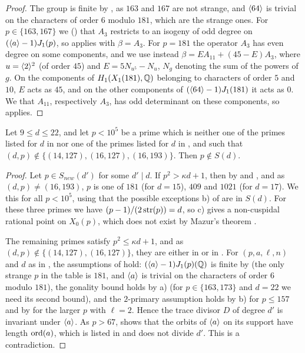 \begin{proof}
The group is finite by , as $163$ and $167$ are not strange, and $\langle 64\rangle$ is trivial on the characters of order $6$ modulo $181$, which are the strange ones. For $p\in\{163,167\}$ we  () that $A_3$ restricts to an isogeny of odd degree on $(\langle a\rangle-1)J_1(p)$, so  applies with $\beta=A_3$. For $p=181$ the operator $A_3$ has even degree on some components, and we use instead $\beta=EA_{11}+(45-E)A_3$, where $u=\langle 2\rangle^2$ (of order $45$) and $E=5N_{u^5}-N_u$, $N_g$ denoting the sum of the powers of $g$. On the components of $H_1(X_1(181),\mathbb{Q})$ belonging to characters of order $5$ and $10$, $E$ acts as $45$, and on the other components of $(\langle 64\rangle-1)J_1(181)$ it acts as $0$. We  that $A_{11}$, respectively $A_3$, has odd determinant on these components, so  applies.
\end{proof}

\begin{proposition}\label{prop:medium}
Let $9\leq d\leq 22$, and let $p<10^5$ be a prime which is neither one of the primes listed for $d$ in  nor one of the primes listed for $d$ in , and such that $(d,p)\notin\{(14,127),(16,127),(16,193)\}$. Then $p\notin S(d)$.
\end{proposition}

\begin{proof}
Let $p\in S_{new}(d')$ for some $d'\mid d$. If $p^2>\kappa d+1$, then by  and \cite[Table 2]{DSt}, and as $(d,p)\neq(16,193)$, $p$ is one of $181$ (for $d=15$), $409$ and $1021$ (for $d=17$). We  this for all $p<10^5$, using that the possible exceptions b) of  are in $S(d)$. For these three primes we have $(p-1)/(2\operatorname{str}(p))=d$, so  c) gives a non-cuspidal rational point on $X_0(p)$, which does not exist by Mazur's theorem \cite[Theorem 1]{mazur78}.

The remaining primes satisfy $p^2\leq \kappa d+1$, and as $(d,p)\notin\{(14,127),(16,127)\}$, they are either in  or in . For $(p,a,\ell,n)$ and $d$ as in , the assumptions of  hold: $(\langle a\rangle-1)J_1(p)(\mathbb{Q})$ is finite by  (the only strange $p$ in the table is $181$, and $\langle a\rangle$ is trivial on the characters of order $6$ modulo $181$), the gonality bound holds by  a) (for $p\in\{163,173\}$ and $d=22$ we need its second bound), and the $2$-primary assumption holds by  b) for $p\leq 157$ and by  for the larger $p$ with $\ell=2$. Hence the trace divisor $D$ of degree $d'$ is invariant under $\langle a\rangle$. As $p>67$,  shows that the orbits of $\langle a\rangle$ on its support have length $\operatorname{ord}(a)$, which is listed in  and does not divide $d'$. This is a contradiction.
\end{proof}

